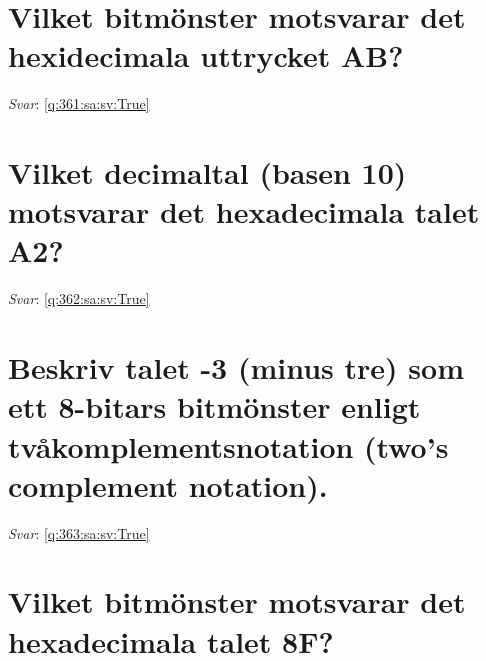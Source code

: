\documentclass[a4paper,11pt,oneside]{book}
\begin{document}
\begin{sloppypar}
\section{Vilket bitm\"onster motsvarar det hexidecimala uttrycket AB?}

\label{q:361:sa:sv:False}

\vspace{2cm}

\noindent\makebox[\textwidth]{\hrulefill}

\vspace{1cm}

\textit{Svar}: \autoref{q:361:sa:sv:True}



\section{Vilket decimaltal (basen 10) motsvarar det hexadecimala talet A2?}

\label{q:362:sa:sv:False}

\vspace{2cm}

\noindent\makebox[\textwidth]{\hrulefill}

\vspace{1cm}

\textit{Svar}: \autoref{q:362:sa:sv:True}



\section{Beskriv talet -3 (minus tre) som ett 8-bitars bitm\"onster enligt tv\r{a}komplementsnotation (two{\textquoteright}s complement notation).}

\label{q:363:sa:sv:False}

\vspace{2cm}

\noindent\makebox[\textwidth]{\hrulefill}

\vspace{1cm}

\textit{Svar}: \autoref{q:363:sa:sv:True}



\section{Vilket bitm\"onster motsvarar det hexadecimala talet 8F?}

\label{q:364:sa:sv:False}


\end{sloppypar}
\end{document}
